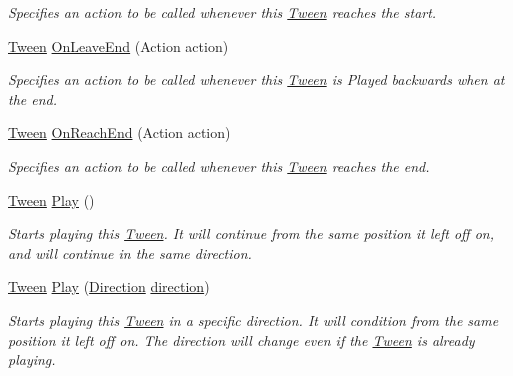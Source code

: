 \begin{DoxyCompactItemize}
\begin{DoxyCompactList}\small\item\em Specifies an action to be called whenever this \mbox{\hyperlink{struct_leap_1_1_unity_1_1_animation_1_1_tween}{Tween}} reaches the start. \end{DoxyCompactList}\item 
\mbox{\hyperlink{struct_leap_1_1_unity_1_1_animation_1_1_tween}{Tween}} \mbox{\hyperlink{struct_leap_1_1_unity_1_1_animation_1_1_tween_ac971360d59e189a9b5f788f1c881969c}{On\+Leave\+End}} (Action action)
\begin{DoxyCompactList}\small\item\em Specifies an action to be called whenever this \mbox{\hyperlink{struct_leap_1_1_unity_1_1_animation_1_1_tween}{Tween}} is Played backwards when at the end. \end{DoxyCompactList}\item 
\mbox{\hyperlink{struct_leap_1_1_unity_1_1_animation_1_1_tween}{Tween}} \mbox{\hyperlink{struct_leap_1_1_unity_1_1_animation_1_1_tween_a6444cd8ffe0160d1431e091f3c4d8649}{On\+Reach\+End}} (Action action)
\begin{DoxyCompactList}\small\item\em Specifies an action to be called whenever this \mbox{\hyperlink{struct_leap_1_1_unity_1_1_animation_1_1_tween}{Tween}} reaches the end. \end{DoxyCompactList}\item 
\mbox{\hyperlink{struct_leap_1_1_unity_1_1_animation_1_1_tween}{Tween}} \mbox{\hyperlink{struct_leap_1_1_unity_1_1_animation_1_1_tween_a00ec83a05cb0637fc0bcc24e8703c572}{Play}} ()
\begin{DoxyCompactList}\small\item\em Starts playing this \mbox{\hyperlink{struct_leap_1_1_unity_1_1_animation_1_1_tween}{Tween}}. It will continue from the same position it left off on, and will continue in the same direction. \end{DoxyCompactList}\item 
\mbox{\hyperlink{struct_leap_1_1_unity_1_1_animation_1_1_tween}{Tween}} \mbox{\hyperlink{struct_leap_1_1_unity_1_1_animation_1_1_tween_a1428d270a9c131173d13fe41c0728088}{Play}} (\mbox{\hyperlink{namespace_leap_1_1_unity_1_1_animation_ab080d4756e4d3d6a2fc9cd9a7f4e695a}{Direction}} \mbox{\hyperlink{struct_leap_1_1_unity_1_1_animation_1_1_tween_ae88d2317428932c7de52a00298005696}{direction}})
\begin{DoxyCompactList}\small\item\em Starts playing this \mbox{\hyperlink{struct_leap_1_1_unity_1_1_animation_1_1_tween}{Tween}} in a specific direction. It will condition from the same position it left off on. The direction will change even if the \mbox{\hyperlink{struct_leap_1_1_unity_1_1_animation_1_1_tween}{Tween}} is already playing. \end{DoxyCompactList}\item 

\end{DoxyCompactItemize}
